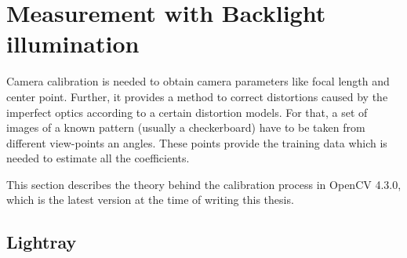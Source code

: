\section{Measurement with Backlight illumination}
Camera calibration is needed to obtain camera parameters like focal length and center point.
Further, it provides a method to correct distortions caused by the imperfect optics according to a certain distortion models.
For that, a set of images of a known pattern (usually a checkerboard) have to be taken from different view-points an angles.
These points provide the training data which is needed to estimate all the coefficients.

This section describes the theory behind the calibration process in OpenCV 4.3.0, which is the latest version at the time of writing this thesis.
\subsection{Lightray }